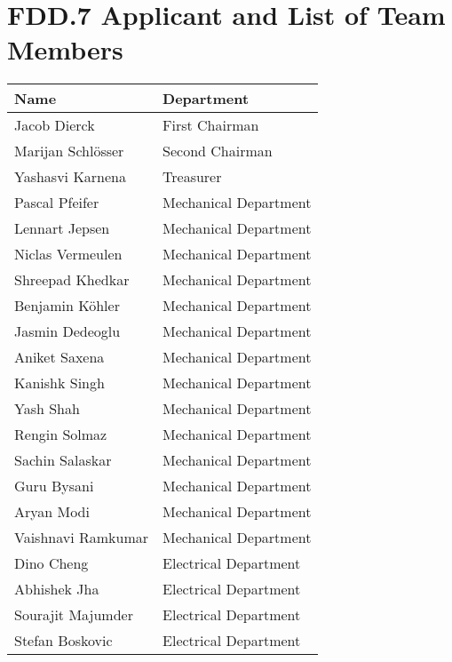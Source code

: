 \section{FDD.7 Applicant and List of Team Members}
\begin{table}[h]
\centering
\begin{tabular}{|l|l|}
\hline
\textbf{Name}           & \textbf{Department}        \\ \hline
Jacob Dierck            & First Chairman             \\ \hline
Marijan Schlösser       & Second Chairman            \\ \hline
Yashasvi Karnena        & Treasurer                  \\ \hline
Pascal Pfeifer          & Mechanical Department      \\ \hline
Lennart Jepsen          & Mechanical Department      \\ \hline
Niclas Vermeulen        & Mechanical Department      \\ \hline
Shreepad Khedkar        & Mechanical Department      \\ \hline
Benjamin Köhler         & Mechanical Department      \\ \hline
Jasmin Dedeoglu         & Mechanical Department      \\ \hline
Aniket Saxena           & Mechanical Department      \\ \hline
Kanishk Singh           & Mechanical Department      \\ \hline
Yash Shah               & Mechanical Department      \\ \hline
Rengin Solmaz           & Mechanical Department      \\ \hline
Sachin Salaskar         & Mechanical Department      \\ \hline
Guru Bysani             & Mechanical Department      \\ \hline
Aryan Modi              & Mechanical Department      \\ \hline
Vaishnavi Ramkumar      & Mechanical Department      \\ \hline
Dino Cheng              & Electrical Department      \\ \hline
Abhishek Jha            & Electrical Department      \\ \hline
Sourajit Majumder       & Electrical Department      \\ \hline
Stefan Boskovic         & Electrical Department      \\ \hline

\end{tabular}
\end{table}
